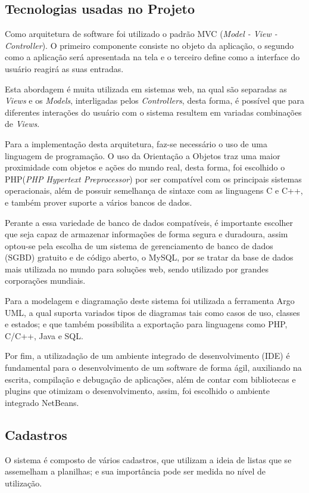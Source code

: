 \documentclass[10pt, twocolumn]{article}
\begin{document}
\subsection{Tecnologias usadas no Projeto}
\label{sect:tup}
Como arquitetura de software foi utilizado o padrão MVC (\textit{Model - View - Controller}). O primeiro componente consiste no objeto da aplicação, o segundo como a aplicação será apresentada na tela e o terceiro define como a interface do usuário reagirá as suas entradas.

Esta abordagem é muita utilizada em sistemas web, na qual são separadas as \textit{Views} e os \textit{Models}, interligadas pelos \textit{Controllers}, desta forma, é possível que para diferentes interações do usuário com o sistema resultem em variadas combinações de \textit{Views}.

Para a implementação desta arquitetura, faz-se necessário o uso de uma linguagem de programação. O uso da Orientação a Objetos traz uma maior proximidade com objetos e ações do mundo real, desta forma, foi escolhido o PHP(\textit{PHP Hypertext Preprocessor}) por ser compatível com os principais sistemas operacionais, além de possuir semelhança de sintaxe com as linguagens C e C++, e também prover suporte a vários bancos de dados.

Perante a essa variedade de banco de dados compatíveis, é importante escolher que seja capaz de armazenar informações de forma segura e duradoura, assim optou-se pela escolha de um sistema de gerenciamento de banco de dados (SGBD) gratuito e de código aberto, o MySQL, por se tratar da base de dados mais utilizada no mundo para soluções web, sendo utilizado por grandes corporações mundiais.

Para a modelagem e diagramação deste sistema foi utilizada a ferramenta Argo UML, a qual suporta variados tipos de diagramas tais como casos de uso, classes e estados; e que também possibilita a exportação para linguagens como PHP, C/C++, Java e SQL.

Por fim, a utilizadação de um ambiente integrado de desenvolvimento (IDE) é fundamental para o desenvolvimento de um software de forma ágil, auxiliando na escrita, compilação e debugação de aplicações, além de contar com bibliotecas e plugins que otimizam o desenvolvimento, assim, foi escolhido o ambiente integrado NetBeans.

\subsection{Cadastros}
\label{sect:cad}
O sistema é composto de vários cadastros, que utilizam a ideia de listas que se assemelham a planilhas; e sua importância pode ser medida no nível de utilização.
\end{document}
